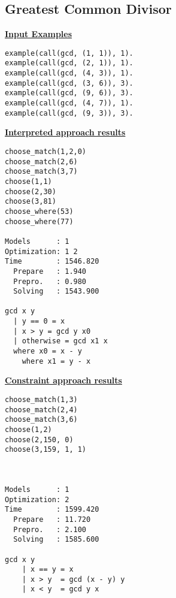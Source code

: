 \subsection{Greatest Common Divisor}
\underline{\textbf{Input Examples}}
\begin{lstlisting}
example(call(gcd, (1, 1)), 1).
example(call(gcd, (2, 1)), 1).
example(call(gcd, (4, 3)), 1).
example(call(gcd, (3, 6)), 3).
example(call(gcd, (9, 6)), 3).
example(call(gcd, (4, 7)), 1).
example(call(gcd, (9, 3)), 3).
\end{lstlisting}
\begin{multicols*}{2}
\underline{\textbf{Interpreted approach results}}
\begin{lstlisting}
choose_match(1,2,0) 
choose_match(2,6) 
choose_match(3,7)   
choose(1,1) 
choose(2,30) 
choose(3,81) 
choose_where(53) 
choose_where(77) 

Models      : 1     
Optimization: 1 2 
Time        : 1546.820
  Prepare   : 1.940
  Prepro.   : 0.980
  Solving   : 1543.900
  
gcd x y
  | y == 0 = x
  | x > y = gcd y x0
  | otherwise = gcd x1 x
  where x0 = x - y
  	where x1 = y - x
\end{lstlisting}
\vspace*{\fill}
\columnbreak
\underline{\textbf{Constraint approach results}}
\begin{lstlisting}
choose_match(1,3)
choose_match(2,4)
choose_match(3,6)  
choose(1,2) 
choose(2,150, 0) 
choose(3,159, 1, 1) 



Models      : 1     
Optimization: 2 
Time        : 1599.420
  Prepare   : 11.720
  Prepro.   : 2.100
  Solving   : 1585.600

gcd x y
	| x == y = x
	| x > y	 = gcd (x - y) y
	| x < y	 = gcd y x
\end{lstlisting}
\end{multicols*}
\pagebreak

\pagebreak
%
%